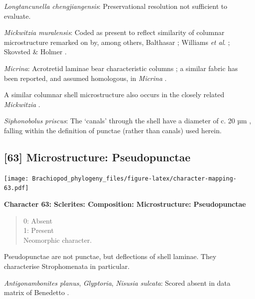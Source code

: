 \documentclass[openany]{book}
\theoremstyle{definition}
\theoremstyle{definition}
\theoremstyle{definition}
\theoremstyle{remark}
\begin{document}
\hypertarget{Longtancunella_chengjiangensis-coding-62}{}
\emph{Longtancunella chengjiangensis}: Preservational resolution not
sufficient to evaluate.

\hypertarget{Mickwitzia_muralensis-coding-62}{}
\emph{Mickwitzia muralensis}: Coded as present to reflect similarity of
columnar microstructure remarked on by, among others, Balthasar
\citeyearpar{Balthasar2008iMummpikia}; Williams \emph{et al}.
\citeyearpar{Williams2007Supplement}; Skovsted \& Holmer
\citeyearpar{Skovsted2003EarlyCambrian}.

\hypertarget{Micrina-coding-62}{}
\emph{Micrina}: Acrotretid laminae bear characteristic columns
\citep[e.g.][]{Zhang2016Epithelialcell}; a similar fabric has been
reported, and assumed homologous, in \emph{Micrina}
\citep{Butler2012ConstructingCambrian}.

A similar columnar shell microstructure also occurs in the closely
related \emph{Mickwitzia} \citep{Balthasar2008iMummpikia}.

\hypertarget{Siphonobolus_priscus-coding-62}{}
\emph{Siphonobolus priscus}: The `canals' through the shell have a
diameter of c. 20 µm \citep[text-fig. 2a]{Williams2004Chemicostructure},
falling within the definition of punctae (rather than canals) used
herein.

\subsection*{{[}63{]} Microstructure:
Pseudopunctae}\label{microstructure-pseudopunctae}

\texttt{[image: Brachiopod\_phylogeny\_files/figure-latex/character-mapping-63.pdf]}

\textbf{Character 63: Sclerites: Composition: Microstructure:
Pseudopunctae}

\begin{quote}
0: Absent\\
1: Present\\
Neomorphic character.
\end{quote}

Pseudopunctae are not punctae, but deflections of shell laminae. They
characterise Strophomenata in particular.

\hypertarget{Antigonambonites_planus-coding-63}{}
\emph{Antigonambonites planus}, \emph{Glyptoria}, \emph{Nisusia
sulcata}: Scored absent in data matrix of Benedetto
\citeyearpar{Benedetto2009iChaniella}.
\end{document}
